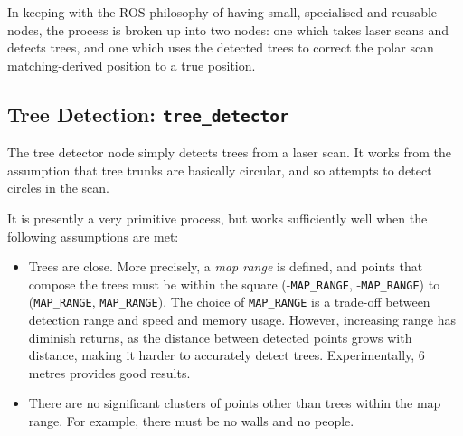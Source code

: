 \documentclass[12pt,oneside,a4paper]{book}
\begin{document}
In keeping with the ROS philosophy of having small, specialised and
reusable nodes, the process is broken up into two nodes: one which
takes laser scans and detects trees, and one which uses the detected
trees to correct the polar scan matching-derived position to a true
position.

\subsection{Tree Detection: \texttt{tree\_detector}}
\label{sec:tree_detector}

The tree detector node simply detects trees from a laser scan. It
works from the assumption that tree trunks are basically circular, and
so attempts to detect circles in the scan.

It is presently a very primitive process, but works sufficiently well
when the following assumptions are met:
\begin{itemize}
\item Trees are close. More precisely, a \emph{map range} is defined,
  and points that compose the trees must be within the square
  (-\texttt{MAP\_RANGE}, -\texttt{MAP\_RANGE}) to (\texttt{MAP\_RANGE},
  \texttt{MAP\_RANGE}). The choice of \texttt{MAP\_RANGE} is a trade-off
  between detection range and speed and memory usage. However,
  increasing range has diminish returns, as the distance between
  detected points grows with distance, making it harder to accurately
  detect trees. Experimentally, 6 metres provides good results.
\item There are no significant clusters of points other than trees
  within the map range. For example, there must be no walls and no
  people.
\end{itemize}
\end{document}
